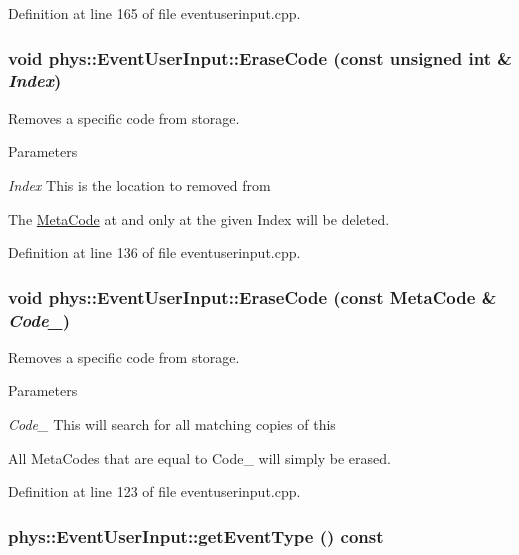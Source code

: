 Definition at line 165 of file eventuserinput.cpp.

\hypertarget{classphys_1_1EventUserInput_a583084578443019d6e286b8f0e02ce58}{
\subsubsection[{EraseCode}]{\setlength{\rightskip}{0pt plus 5cm}void phys::EventUserInput::EraseCode (const unsigned int \& {\em Index})}}
\label{d7/df5/classphys_1_1EventUserInput_a583084578443019d6e286b8f0e02ce58}


Removes a specific code from storage. 


\begin{DoxyParams}{Parameters}
\item[{\em Index}]This is the location to removed from\end{DoxyParams}
The \hyperlink{classphys_1_1MetaCode}{MetaCode} at and only at the given Index will be deleted. 

Definition at line 136 of file eventuserinput.cpp.

\hypertarget{classphys_1_1EventUserInput_a34c05a76a790435799441da75a83fa9c}{
\subsubsection[{EraseCode}]{\setlength{\rightskip}{0pt plus 5cm}void phys::EventUserInput::EraseCode (const {\bf MetaCode} \& {\em Code\_\-})}}
\label{d7/df5/classphys_1_1EventUserInput_a34c05a76a790435799441da75a83fa9c}


Removes a specific code from storage. 


\begin{DoxyParams}{Parameters}
\item[{\em Code\_\-}]This will search for all matching copies of this\end{DoxyParams}
All MetaCodes that are equal to Code\_\- will simply be erased. 

Definition at line 123 of file eventuserinput.cpp.

\hypertarget{classphys_1_1EventUserInput_ab31bb312cde99c0a2bf64af012ee4b87}{
\subsubsection[{getEventType}]{ phys::EventUserInput::getEventType () const}}
\label{d7/df5/classphys_1_1EventUserInput_ab31bb312cde99c0a2bf64af012ee4b87}


